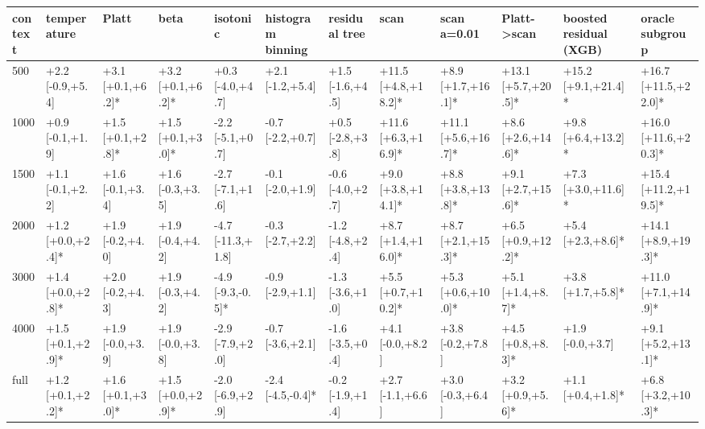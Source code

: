 \begin{tabular}{llllllllllll}
\toprule
context & temperature & Platt & beta & isotonic & histogram binning & residual tree & scan & scan a=0.01 & Platt->scan & boosted residual (XGB) & oracle subgroup \\
\midrule
500 & +2.2 [-0.9,+5.4] & +3.1 [+0.1,+6.2]* & +3.2 [+0.1,+6.2]* & +0.3 [-4.0,+4.7] & +2.1 [-1.2,+5.4] & +1.5 [-1.6,+4.5] & +11.5 [+4.8,+18.2]* & +8.9 [+1.7,+16.1]* & +13.1 [+5.7,+20.5]* & +15.2 [+9.1,+21.4]* & +16.7 [+11.5,+22.0]* \\
1000 & +0.9 [-0.1,+1.9] & +1.5 [+0.1,+2.8]* & +1.5 [+0.1,+3.0]* & -2.2 [-5.1,+0.7] & -0.7 [-2.2,+0.7] & +0.5 [-2.8,+3.8] & +11.6 [+6.3,+16.9]* & +11.1 [+5.6,+16.7]* & +8.6 [+2.6,+14.6]* & +9.8 [+6.4,+13.2]* & +16.0 [+11.6,+20.3]* \\
1500 & +1.1 [-0.1,+2.2] & +1.6 [-0.1,+3.4] & +1.6 [-0.3,+3.5] & -2.7 [-7.1,+1.6] & -0.1 [-2.0,+1.9] & -0.6 [-4.0,+2.7] & +9.0 [+3.8,+14.1]* & +8.8 [+3.8,+13.8]* & +9.1 [+2.7,+15.6]* & +7.3 [+3.0,+11.6]* & +15.4 [+11.2,+19.5]* \\
2000 & +1.2 [+0.0,+2.4]* & +1.9 [-0.2,+4.0] & +1.9 [-0.4,+4.2] & -4.7 [-11.3,+1.8] & -0.3 [-2.7,+2.2] & -1.2 [-4.8,+2.4] & +8.7 [+1.4,+16.0]* & +8.7 [+2.1,+15.3]* & +6.5 [+0.9,+12.2]* & +5.4 [+2.3,+8.6]* & +14.1 [+8.9,+19.3]* \\
3000 & +1.4 [+0.0,+2.8]* & +2.0 [-0.2,+4.3] & +1.9 [-0.3,+4.2] & -4.9 [-9.3,-0.5]* & -0.9 [-2.9,+1.1] & -1.3 [-3.6,+1.0] & +5.5 [+0.7,+10.2]* & +5.3 [+0.6,+10.0]* & +5.1 [+1.4,+8.7]* & +3.8 [+1.7,+5.8]* & +11.0 [+7.1,+14.9]* \\
4000 & +1.5 [+0.1,+2.9]* & +1.9 [-0.0,+3.9] & +1.9 [-0.0,+3.8] & -2.9 [-7.9,+2.0] & -0.7 [-3.6,+2.1] & -1.6 [-3.5,+0.4] & +4.1 [-0.0,+8.2] & +3.8 [-0.2,+7.8] & +4.5 [+0.8,+8.3]* & +1.9 [-0.0,+3.7] & +9.1 [+5.2,+13.1]* \\
full & +1.2 [+0.1,+2.2]* & +1.6 [+0.1,+3.0]* & +1.5 [+0.0,+2.9]* & -2.0 [-6.9,+2.9] & -2.4 [-4.5,-0.4]* & -0.2 [-1.9,+1.4] & +2.7 [-1.1,+6.6] & +3.0 [-0.3,+6.4] & +3.2 [+0.9,+5.6]* & +1.1 [+0.4,+1.8]* & +6.8 [+3.2,+10.3]* \\
\bottomrule
\end{tabular}
